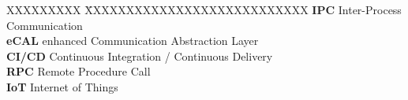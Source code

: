 \documentclass[a4paper,12pt,singlespacing]{article}
\begin{document}
\begin{tabbing}
	XXXXXXXXX \= XXXXXXXXXXXXXXXXXXXXXXXXXXX \kill %
	\textbf{IPC} \> Inter-Process Communication\\[0.5cm]
	\textbf{eCAL} \> enhanced Communication Abstraction Layer\\[0.5cm]
	\textbf{CI/CD} \> Continuous Integration / Continuous Delivery\\[0.5cm]
	\textbf{RPC} \> Remote Procedure Call\\[0.5cm]
	\textbf{IoT} \> Internet of Things\\[0.5cm]
\end{tabbing}

\pagebreak






\printbibliography[heading=bibintoc]
\end{document}

